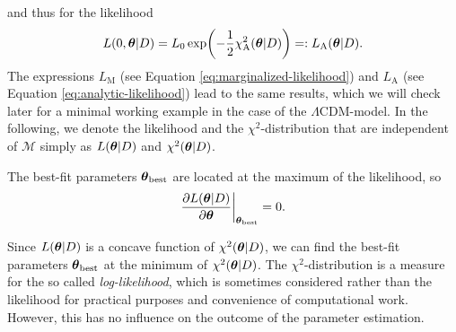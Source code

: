 and thus for the likelihood
\begin{align}
    L(0, \vb*{\theta} \vert D) = L_{0} \exp \biggl(-\frac{1}{2} \chi_{\text{A}}^2(\vb*{\theta} \vert D) \biggr) =: L_{\text{A}}(\vb*{\theta} \vert D). \label{eq:analytic-likelihood} 
\end{align}
The expressions $L_{\text{M}}$ (see Equation \eqref{eq:marginalized-likelihood}) and $L_{\text{A}}$ (see Equation \eqref{eq:analytic-likelihood}) lead to the same results, which we will check later for a minimal working example in the case of the $\Lambda$CDM-model. In the following, we denote the likelihood and the $\chi^2$-distribution that are independent of $\mathcal{M}$ simply as $L(\vb*{\theta} \vert D)$ and $\chi^2(\vb*{\theta} \vert D)$. 

\noindent The best-fit parameters $\vb*{\theta}_{\text{best}}$ are located at the maximum of the likelihood, so 
\begin{align}
    \pdv{L(\vb*{\theta} \vert D)}{\vb*{\theta}} \bigg \vert_{\vb*{\theta}_{\text{best}}} = 0.
\end{align}

\noindent Since $L(\vb*{\theta} \vert D)$ is a concave function of $\chi^2(\vb*{\theta} \vert D)$, we can find the best-fit parameters $\vb*{\theta}_{\text{best}}$ at the minimum of $\chi^2(\vb*{\theta} \vert D)$. The $\chi^2$-distribution is a measure for the so called \textit{log-likelihood}, which is sometimes considered rather than the likelihood for practical purposes and convenience of computational work. However, this has no influence on the outcome of the parameter estimation. \\

